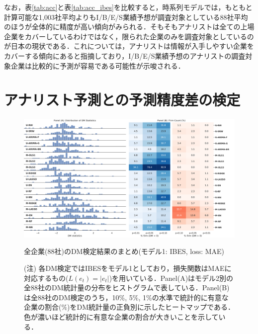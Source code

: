 \documentclass[a4paper，12pt]{jsarticle}
\begin{document}

なお，表\ref{tab:acc}と表\ref{tab:acc_ibes}を比較すると，時系列モデルでは，もともと計算可能な1,003社平均よりもI/B/E/S業績予想が調査対象としている88社平均のほうが全体的に精度が高い傾向がみられる．そもそもアナリストは全ての上場企業をカバーしているわけではなく，限られた企業のみを調査対象としているのが日本の現状である．これについて\cite{nakai2006}は，アナリストは情報が入手しやすい企業をカバーする傾向にあると指摘しており，I/B/E/S業績予想のアナリストの調査対象企業は比較的に予測が容易である可能性が示唆される．

\section{アナリスト予測との予測精度差の検定}

\begin{figure}[htbp]
  \centering
  \includegraphics[width=15cm]{./img/_dm_MAD_y_hat_ibes.pdf}
  \caption{全企業(88社)のDM検定結果のまとめ(モデル1: IBES, loss: MAE)}
  \label{fig:dm_ibes_mad}
  \caption*{(注) 各DM検定ではIBESをモデル1としており，損失関数はMAEに対応するもの($L(e_t)=|e_t|$)を用いている．Panel(A)はモデル2別の全88社のDM統計量の分布をヒストグラムで表している．Panel(B)は全88社のDM検定のうち，10\%, 5\%, 1\%の水準で統計的に有意な企業の割合(\%)をDM統計量の正負別に示したヒートマップである．色が濃いほど統計的に有意な企業の割合が大きいことを示している．}
\end{figure}
\end{document}
